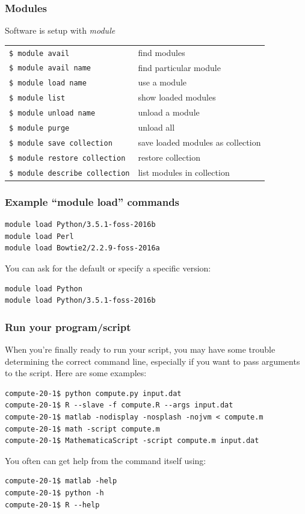 \documentclass[10pt]{beamer}
\begin{document}
\begin{frame}[fragile]
\frametitle{Modules}

Software is setup with \it{module}

\begin{tabular}{|l|l|}
\hline
\verb+$ module avail + & find modules \\
\verb+$ module avail name+ & find particular module \\
\verb+$ module load name+ & use a module \\
\verb+$ module list+ & show loaded modules \\
\verb+$ module unload name+ & unload a module \\ 
\verb+$ module purge+ & unload all \\
\verb+$ module save collection + & save loaded modules as collection \\
\verb+$ module restore collection+ & restore collection \\
\verb+$ module describe collection+ & list modules in collection \\
\hline
\end{tabular}

\end{frame}

\begin{frame}[fragile]
\frametitle{Example ``module load'' commands}

\begin{verbatim}
module load Python/3.5.1-foss-2016b
module load Perl
module load Bowtie2/2.2.9-foss-2016a
\end{verbatim}

You can ask for the default or specify a specific version:
\begin{verbatim}
module load Python
module load Python/3.5.1-foss-2016b
\end{verbatim}

\end{frame}

\begin{frame}[fragile]
\frametitle{Run your program/script}
When you're finally ready to run your script, you may have some
trouble determining the correct command line, especially if you want to
pass arguments to the script.  Here are some examples:

\begin{verbatim}
compute-20-1$ python compute.py input.dat
compute-20-1$ R --slave -f compute.R --args input.dat
compute-20-1$ matlab -nodisplay -nosplash -nojvm < compute.m
compute-20-1$ math -script compute.m
compute-20-1$ MathematicaScript -script compute.m input.dat
\end{verbatim}

You often can get help from the command itself using:

\begin{verbatim}
compute-20-1$ matlab -help
compute-20-1$ python -h
compute-20-1$ R --help
\end{verbatim}
\end{frame}
\end{document}
